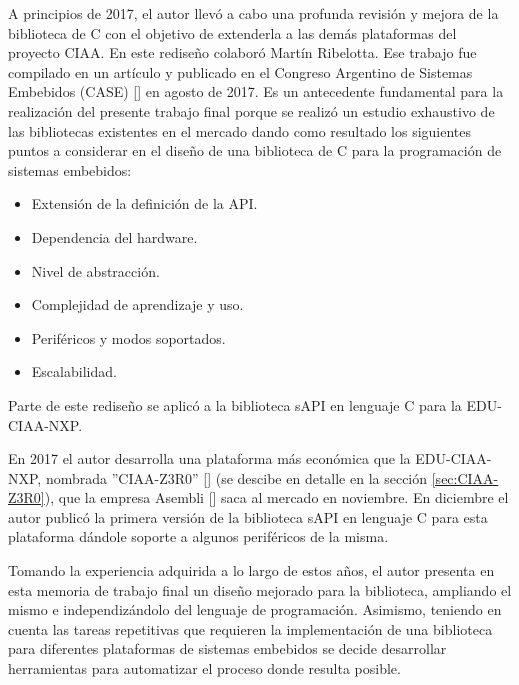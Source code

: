 A principios de 2017, el autor llevó a cabo una profunda revisión y mejora de la biblioteca de C con el objetivo de extenderla a las demás plataformas del proyecto CIAA. En este rediseño colaboró Martín Ribelotta. Ese trabajo fue compilado en un artículo y publicado en el Congreso Argentino de Sistemas Embebidos (CASE) [] en agosto de 2017. Es un antecedente fundamental para la realización del presente trabajo final porque se realizó un estudio exhaustivo de las bibliotecas existentes en el mercado dando como resultado los siguientes puntos a considerar en el diseño de una biblioteca de C para la programación de sistemas embebidos:

\begin{itemize}
\item
Extensión de la definición de la API.
\item
Dependencia del hardware.
\item
Nivel de abstracción.
\item
Complejidad de aprendizaje y uso.
\item
Periféricos y modos soportados.
\item
Escalabilidad.
\end{itemize}

Parte de este rediseño se aplicó a la biblioteca sAPI en lenguaje C para la EDU-CIAA-NXP.

En 2017 el autor desarrolla una plataforma más económica que la EDU-CIAA-NXP, nombrada ''CIAA-Z3R0'' [] (se descibe en detalle en la sección \ref{sec:CIAA-Z3R0}), que la empresa Asembli [] saca al mercado en noviembre. En diciembre el autor publicó la primera versión de la biblioteca sAPI en lenguaje C para esta plataforma dándole soporte a algunos periféricos de la misma.

Tomando la experiencia adquirida a lo largo de estos años, el autor presenta en esta memoria de trabajo final un diseño mejorado para la biblioteca, ampliando el mismo e independizándolo del lenguaje de programación. Asimismo, teniendo en cuenta las tareas repetitivas que requieren la implementación de una biblioteca para diferentes plataformas de sistemas embebidos se decide desarrollar herramientas para automatizar el proceso donde resulta posible.

